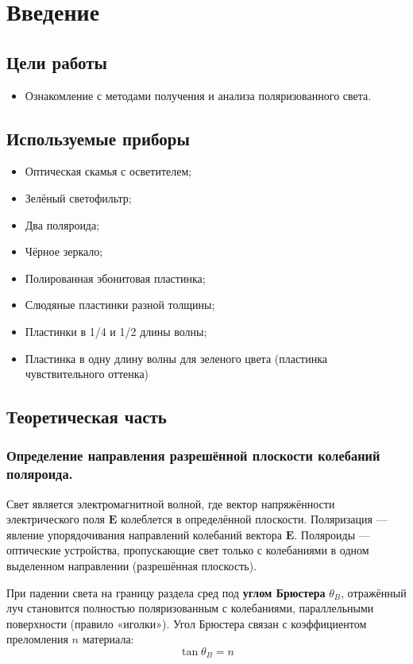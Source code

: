 \section{Введение}
\subsection{Цели работы} 
\begin{itemize}
    \item Ознакомление с методами получения и анализа поляризованного света.
\end{itemize}

\subsection{Используемые приборы}
\begin{itemize}
    \item Оптическая скамья с осветителем;
    \item Зелёный светофильтр;
    \item Два поляроида;
    \item Чёрное зеркало;
    \item Полированная эбонитовая пластинка;
    \item Слюдяные пластинки разной толщины;
    \item Пластинки в 1/4 и 1/2 длины волны;
    \item Пластинка в одну длину волны для зеленого цвета (пластинка чувствительного оттенка)
\end{itemize}

\subsection{Теоретическая часть}

\subsubsection{Определение направления разрешённой плоскости колебаний
поляроида.}
Свет является электромагнитной волной, где вектор напряжённости электрического поля \( \mathbf{E} \) колеблется в определённой плоскости. Поляризация — явление упорядочивания направлений колебаний вектора \( \mathbf{E} \). Поляроиды — оптические устройства, пропускающие свет только с колебаниями в одном выделенном направлении (разрешённая плоскость).


При падении света на границу раздела сред под \textbf{углом Брюстера} \( \theta_B \), отражённый луч становится полностью поляризованным с колебаниями, параллельными поверхности (правило «иголки»). Угол Брюстера связан с коэффициентом преломления \( n \) материала:
\begin{equation}
    \tan\theta_B = n
\end{equation}


